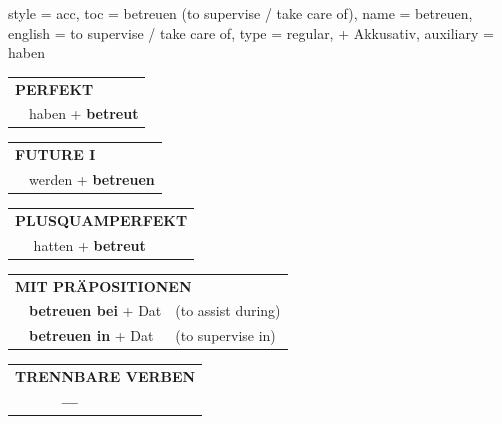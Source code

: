 \begin{verbentry}{
  style = {acc},
  toc = {betreuen (to supervise / take care of)},
  name = {betreuen},
  english = {to supervise / take care of},
  type = {regular, + Akkusativ},
  auxiliary = {haben}
}
\vspace{10pt}

\begin{tabular}{rl}
\multicolumn{2}{l}{\textbf{PERFEKT}}\\
& haben + \textbf{betreut}\\
\end{tabular}
\hfill
\begin{tabular}{rl}
\multicolumn{2}{l}{\textbf{FUTURE I}}\\
& werden + \textbf{betreuen}\\
\end{tabular}
\hfill
\begin{tabular}{rl}
\multicolumn{2}{l}{\textbf{PLUSQUAMPERFEKT}}\\
& hatten + \textbf{betreut}\\
\end{tabular}

\vspace{10pt}

\begin{tabular}{lll}
\multicolumn{3}{l}{\textbf{MIT PRÄPOSITIONEN}}\\
& \textbf{betreuen bei} + Dat & (to assist during)\\
& \textbf{betreuen in} + Dat & (to supervise in)\\
\end{tabular}
\hfill
\begin{tabular}{lll}
\multicolumn{3}{l}{\textbf{TRENNBARE VERBEN}}\\
& \textbf{---} & \\
\end{tabular}
\vspace{-5pt}
\end{verbentry}

